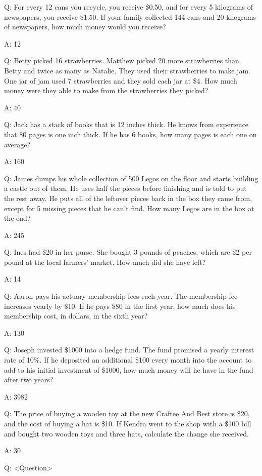 \documentclass[11pt]{article}
\begin{document}
Q: For every 12 cans you recycle, you receive \$0.50, and for every 5 kilograms of newspapers, you receive \$1.50. If your family collected 144 cans and 20 kilograms of newspapers, how much money would you receive?

A: 12

Q: Betty picked 16 strawberries. Matthew picked 20 more strawberries than Betty and twice as many as Natalie. They used their strawberries to make jam. One jar of jam used 7 strawberries and they sold each jar at \$4. How much money were they able to make from the strawberries they picked?

A: 40

Q: Jack has a stack of books that is 12 inches thick. He knows from experience that 80 pages is one inch thick. If he has 6 books, how many pages is each one on average?

A: 160

Q: James dumps his whole collection of 500 Legos on the floor and starts building a castle out of them.  He uses half the pieces before finishing and is told to put the rest away.  He puts all of the leftover pieces back in the box they came from, except for 5 missing pieces that he can't find.  How many Legos are in the box at the end?

A: 245

Q: Ines had \$20 in her purse. She bought 3 pounds of peaches, which are \$2 per pound at the local farmers' market. How much did she have left?

A: 14

Q: Aaron pays his actuary membership fees each year. The membership fee increases yearly by \$10. If he pays \$80 in the first year, how much does his membership cost, in dollars, in the sixth year?

A: 130

Q: Joseph invested \$1000 into a hedge fund. The fund promised a yearly interest rate of 10\%. If he deposited an additional \$100 every month into the account to add to his initial investment of \$1000, how much money will he have in the fund after two years?

A: 3982

Q: The price of buying a wooden toy at the new Craftee And Best store is \$20, and the cost of buying a hat is \$10. If Kendra went to the shop with a \$100 bill and bought two wooden toys and three hats, calculate the change she received.

A: 30

Q: <Question>
\end{document}
